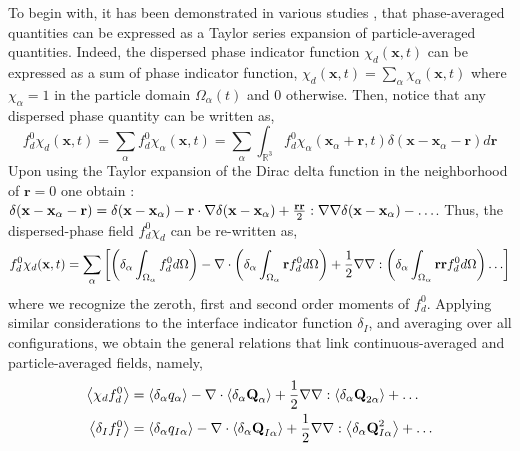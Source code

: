 To begin with, it has been demonstrated in various studies \citep{nott2011suspension,jackson1997locally,zhang1994averaged}, that phase-averaged quantities can be expressed as a Taylor series expansion of particle-averaged quantities. 
Indeed, the dispersed phase indicator function $\chi_d(\textbf{x},t)$ can be expressed as a sum of phase indicator function, $\chi_d(\textbf{x},t) = \sum_\alpha\chi_\alpha(\textbf{x},t)$ where $\chi_\alpha =1$ in the particle domain $\Omega_\alpha(t)$ and $0$ otherwise. 
Then, notice that any dispersed phase quantity can be written as, 
\begin{equation*}
    f^0_d \chi_d(\textbf{x},t)
    = \sum_\alpha f^0_d \chi_\alpha(\textbf{x},t) 
    = \sum_\alpha \int_{\mathbb{R}^3} f^0_d \chi_\alpha(\textbf{x}_\alpha+\textbf{r},t)\delta(\textbf{x}- \textbf{x}_\alpha - \textbf{r}) d\textbf{r} 
    \label{eq:taylor_f_d}
\end{equation*}
Upon using the Taylor expansion of the Dirac delta function in the neighborhood of $\textbf{r}=0$ one obtain :  $\delta(\textbf{x}- \textbf{x}_\alpha - \textbf{r}) = \delta(\textbf{x}- \textbf{x}_\alpha) - \textbf{r}\cdot\mathbf{\nabla} \delta(\textbf{x} - \textbf{x}_\alpha) + \frac{\textbf{rr}}{2}:\mathbf{\nabla}\mathbf{\nabla}\delta(\textbf{x}- \textbf{x}_\alpha) - \ldots $.
Thus, the dispersed-phase field $f_d^0\chi_d$ can be re-written as, 
\begin{equation*}
    f^0_d \chi_d(\textbf{x},t)
    = \sum_\alpha \left[
          \left(\delta_\alpha\int_{\Omega_\alpha} f^0_d d\Omega\right)
        - \mathbf{\nabla}\cdot\left(\delta_\alpha\int_{\Omega_\alpha} \textbf{r} f^0_d d\Omega\right)
        + \frac{1}{2}\mathbf{\nabla}\mathbf{\nabla} :\left(\delta_\alpha\int_{\Omega_\alpha} \textbf{rr} f^0_d d\Omega\right)
        \ldots
    \right]
\end{equation*}
where we recognize the zeroth, first and second order moments of $f_d^0$. 
Applying similar considerations to the interface indicator function $\delta_I$, and averaging over all configurations, we obtain the general relations that link continuous-averaged and particle-averaged fields, namely, 
\begin{align}
    \left<\chi_df_d^0\right> 
    &=  \left<\delta_\alpha q_\alpha\right>
        - \mathbf{\nabla}\cdot  
        \left<\delta_\alpha \textbf{Q}_\alpha\right>        
        + \frac{1}{2} \mathbf{\nabla}\mathbf{\nabla} : \left<\delta_\alpha \textbf{Q}_{2\alpha}\right>
        + \ldots  
        \nonumber\\
    \left<\delta_I f_I^0\right> 
    &=  \left<\delta_\alpha q_{I\alpha}\right>        
        - \mathbf{\nabla}\cdot \left<\delta_\alpha \textbf{Q}_{I\alpha}\right>
        + \frac{1}{2} \mathbf{\nabla}\mathbf{\nabla} : \left<\delta_\alpha \textbf{Q}_{I\alpha}^{2}\right>
        + \ldots  
    \label{eq:f_exp}
\end{align}
